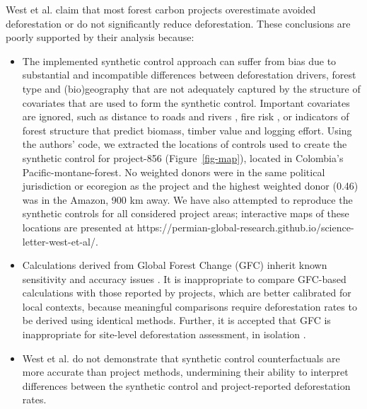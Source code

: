 \documentclass[
  number,
  3p]{elsarticle}
\begin{document}
West et al. \citep{west_action_2023} claim that most forest carbon
projects overestimate avoided deforestation or do not significantly
reduce deforestation. These conclusions are poorly supported by their
analysis because:

\begin{itemize}
\item
  The implemented synthetic control approach can suffer from bias
  \citep{abadie_using_2021} due to substantial and incompatible
  differences between deforestation drivers, forest type and
  (bio)geography that are not adequately captured by the structure of
  covariates that are used to form the synthetic control. Important
  covariates are ignored, such as distance to roads and rivers
  \citep{laurance_roads_2017, barber_roads_2014}, fire risk
  \citep{amador-jimenez_unintended_2020}, or indicators of forest
  structure \citep{duncanson_aboveground_2022} that predict biomass,
  timber value and logging effort. Using the authors' code, we extracted
  the locations of controls used to create the synthetic control for
  project-856 (Figure~\ref{fig-map}), located in Colombia's
  Pacific-montane-forest. No weighted donors were in the same political
  jurisdiction or ecoregion as the project and the highest weighted
  donor (0.46) was in the Amazon, 900 km away. We have also attempted to
  reproduce the synthetic controls for all considered project areas;
  interactive maps of these locations are presented at
  https://permian-global-research.github.io/science-letter-west-et-al/.
\item
  Calculations derived from Global Forest Change (GFC)
  \citep{hansen_quantification_2010} inherit known sensitivity and
  accuracy issues
  \citep{kinnebrew_biases_2022, galiatsatos_assessment_2020}. It is
  inappropriate to compare GFC-based calculations with those reported by
  projects, which are better calibrated for local contexts, because
  meaningful comparisons require deforestation rates to be derived using
  identical methods. Further, it is accepted that GFC is inappropriate
  for site-level deforestation assessment, in isolation
  \citep{galiatsatos_assessment_2020, bos_global_2019}.
\item
  West et al. \citep{west_action_2023} do not demonstrate that synthetic
  control counterfactuals are more accurate than project methods,
  undermining their ability to interpret differences between the
  synthetic control and project-reported deforestation rates.
\end{itemize}
\end{document}
